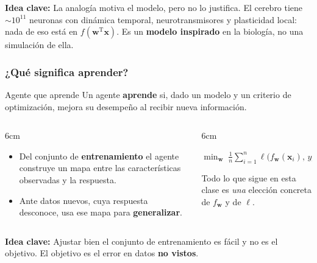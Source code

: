\documentclass[aspectratio=169, 10pt]{beamer}
\newcommand{\formula}[1]{%
	\begin{tcolorbox}[colback=UCMBlue!8, colframe=UCMBlue, arc=4pt,
		boxsep=2pt, left=6pt, right=6pt, top=3pt, bottom=3pt]
		#1
	\end{tcolorbox}
}
\newcommand{\idea}[1]{%
	\begin{tcolorbox}[colback=AccentGreen!6, colframe=AccentGreen, arc=3pt,
		width=\textwidth, boxsep=1pt, left=5pt, right=5pt, top=2pt, bottom=2pt,
		fontupper=\small]
		\RaggedRight\textbf{Idea clave:} #1
	\end{tcolorbox}
}
\begin{document}
\begin{frame}
\begin{center}
{}
\end{center}
\vspace{0.1em}
\idea{La analog\'ia motiva el modelo, pero no lo justifica. El cerebro tiene $\sim\!10^{11}$ neuronas con din\'amica temporal, neurotransmisores y plasticidad local: nada de eso est\'a en $f(\mathbf{w}^{\mathrm{T}}\mathbf{x})$. Es un \textbf{modelo inspirado} en la biolog\'ia, no una simulaci\'on de ella.}
\end{frame}

\begin{frame}
\frametitle{¿Qué significa aprender?}
\begin{block}{Agente que aprende}
Un agente \textbf{aprende} si, dado un modelo y un criterio de optimizaci\'on, mejora su desempe\~no al recibir nueva informaci\'on.
\end{block}
\pause
\begin{columns}[T]
\begin{column}{6cm}
\begin{itemize}
	\item Del conjunto de \textbf{entrenamiento} el agente construye un mapa entre las caracter\'isticas observadas y la respuesta.
	\item Ante datos nuevos, cuya respuesta desconoce, usa ese mapa para \textbf{generalizar}.
\end{itemize}
\end{column}
\begin{column}{6cm}
\formula{\centering
$\displaystyle \min_{\mathbf w} \; \frac{1}{n}\sum_{i=1}^{n} \ell\big(f_{\mathbf w}(\mathbf x_i),\, y_i\big)$}
\footnotesize
Todo lo que sigue en esta clase es \emph{una} elecci\'on concreta de $f_{\mathbf w}$ y de $\ell$.
\end{column}
\end{columns}
\vspace{0.3em}
\idea{Ajustar bien el conjunto de entrenamiento es f\'acil y no es el objetivo. El objetivo es el error en datos \textbf{no vistos}.}
\end{frame}
\end{document}
